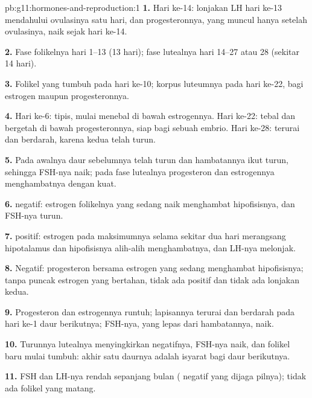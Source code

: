 \begin{solution}{pb:g11:hormones-and-reproduction:1}
\textbf{1.} Hari ke-14: lonjakan LH hari ke-13 mendahului ovulasinya
satu hari, dan progesteronnya, yang muncul hanya setelah ovulasinya,
naik sejak hari ke-14.

\textbf{2.} Fase folikelnya hari 1--13 (13 hari); fase lutealnya hari
14--27 atau 28 (sekitar 14 hari).

\textbf{3.} Folikel yang tumbuh pada hari ke-10; korpus luteumnya pada
hari ke-22, bagi estrogen maupun progesteronnya.

\textbf{4.} Hari ke-6: tipis, mulai menebal di bawah estrogennya. Hari
ke-22: tebal dan bergetah di bawah progesteronnya, siap bagi sebuah
embrio. Hari ke-28: terurai dan berdarah, karena kedua  telah
turun.

\textbf{5.} Pada awalnya  daur sebelumnya telah turun dan
hambatannya ikut turun, sehingga FSH-nya naik; pada fase lutealnya
progesteron dan estrogennya menghambatnya dengan kuat.

\textbf{6.}  negatif: estrogen folikelnya yang sedang naik
menghambat hipofisisnya, dan FSH-nya turun.

\textbf{7.}  positif: estrogen pada maksimumnya selama
sekitar dua hari merangsang hipotalamus dan hipofisisnya alih-alih
menghambatnya, dan LH-nya melonjak.

\textbf{8.} Negatif: progesteron bersama estrogen yang sedang
menghambat hipofisisnya; tanpa puncak estrogen yang bertahan, tidak ada
 positif dan tidak ada lonjakan kedua.

\textbf{9.} Progesteron dan estrogennya runtuh; lapisannya terurai dan
berdarah pada hari ke-1 daur berikutnya; FSH-nya, yang lepas dari
hambatannya, naik.

\textbf{10.} Turunnya  lutealnya menyingkirkan 
negatifnya, FSH-nya naik, dan folikel baru mulai tumbuh: akhir satu
daurnya adalah isyarat bagi daur berikutnya.

\textbf{11.} FSH dan LH-nya rendah sepanjang bulan ( negatif
yang dijaga  pilnya); tidak ada folikel yang matang.


\end{solution}
